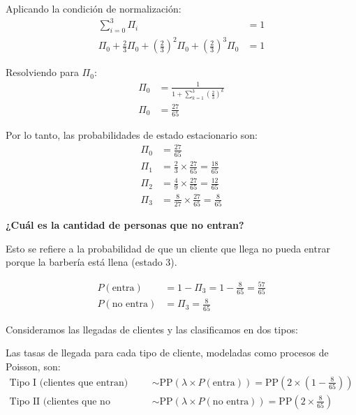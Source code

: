 \documentclass{article}
\begin{document}
Aplicando la condición de normalización:
\begin{align*}
\sum_{i=0}^{3} \Pi_i &= 1 \\
\Pi_0 + \frac{2}{3}\Pi_0 + \left(\frac{2}{3}\right)^2\Pi_0 + \left(\frac{2}{3}\right)^3\Pi_0 &= 1
\end{align*}

Resolviendo para $\Pi_0$:
\begin{align*}
\Pi_0 &= \frac{1}{1 + \sum_{k=1}^{3} \left(\frac{2}{3}\right)^k} \\
\Pi_0 &= \frac{27}{65}
\end{align*}

Por lo tanto, las probabilidades de estado estacionario son:
\begin{align*}
\Pi_0 &= \frac{27}{65} \\
\Pi_1 &= \frac{2}{3} \times \frac{27}{65} = \frac{18}{65} \\
\Pi_2 &= \frac{4}{9} \times \frac{27}{65} = \frac{12}{65} \\
\Pi_3 &= \frac{8}{27} \times \frac{27}{65} = \frac{8}{65}
\end{align*}

\textbf{¿Cuál es la cantidad de personas que no entran?}

Esto se refiere a la probabilidad de que un cliente que llega no pueda entrar porque la barbería está llena (estado 3).

\begin{align*}
P(\text{entra}) &= 1 - \Pi_3 = 1 - \frac{8}{65} = \frac{57}{65} \\
P(\text{no entra}) &= \Pi_3 = \frac{8}{65}
\end{align*}

Consideramos las llegadas de clientes y las clasificamos en dos tipos:

\begin{center}
\end{center}

Las tasas de llegada para cada tipo de cliente, modeladas como procesos de Poisson, son:
\begin{align*}
\text{Tipo I (clientes que entran)} &\sim \text{PP}\left(\lambda \times P(\text{entra})\right) = \text{PP}\left(2 \times \left(1 - \frac{8}{65}\right)\right) \\
\text{Tipo II (clientes que no entran)} &\sim \text{PP}\left(\lambda \times P(\text{no entra})\right) = \text{PP}\left(2 \times \frac{8}{65}\right)
\end{align*}
\end{document}
